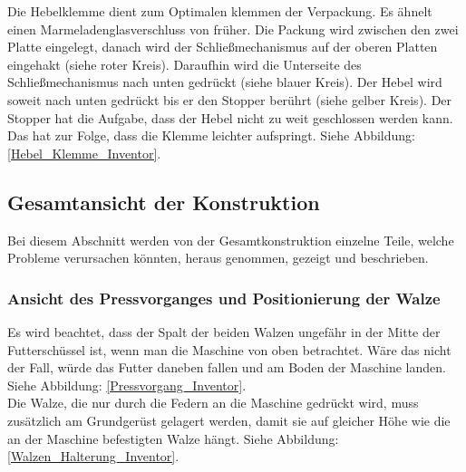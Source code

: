 Die Hebelklemme dient zum Optimalen klemmen der Verpackung.
Es ähnelt einen Marmeladenglasverschluss von früher. Die Packung wird zwischen den zwei Platte eingelegt, danach wird der Schließmechanismus auf der oberen Platten eingehakt (siehe roter Kreis). Daraufhin wird die Unterseite des Schließmechanismus nach unten gedrückt (siehe blauer Kreis).
Der Hebel wird soweit nach unten gedrückt bis er den Stopper berührt (siehe gelber Kreis). Der Stopper hat die Aufgabe, dass der Hebel nicht zu weit geschlossen werden kann. Das hat zur Folge, dass die Klemme leichter aufspringt. Siehe Abbildung: \ref{Hebel_Klemme_Inventor}.



\subsection{Gesamtansicht der Konstruktion}

Bei diesem Abschnitt werden von der Gesamtkonstruktion einzelne Teile, welche Probleme verursachen könnten, heraus genommen, gezeigt und beschrieben.

\subsubsection{Ansicht des Pressvorganges und Positionierung der Walze}

Es wird beachtet, dass der Spalt der beiden Walzen ungefähr in der Mitte der Futterschüssel ist, wenn man die Maschine von oben betrachtet. Wäre das nicht der Fall, würde das Futter daneben fallen und am Boden der Maschine landen. Siehe Abbildung: \ref{Pressvorgang_Inventor}.\\

Die Walze, die nur durch die Federn an die Maschine gedrückt wird, muss zusätzlich am Grundgerüst gelagert werden, damit sie auf gleicher Höhe wie die an der Maschine befestigten Walze hängt. Siehe Abbildung: \ref{Walzen_Halterung_Inventor}.

